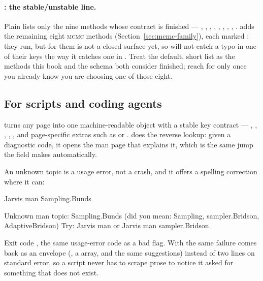 \paragraph{: the stable/unstable line.} Plain 
lists only the nine methods whose  contract is finished ---
, , , ,
, , , ,
.  adds the remaining eight \textsc{mcmc} methods
(Section~\ref{sec:mcmc-family}), each marked : they run, but
 for them is not a closed surface yet, so  will
not catch a typo in one of their keys the way it catches one in
. Treat the default, short list as the methods this book and
the schema both consider finished; reach for  only once you already know
you are choosing one of those eight.

\subsection{For scripts and coding agents}

 turns any page into one machine-readable object with a stable key
contract --- , , , ,
, and page-specific extras such as  or
.  does the reverse lookup: given a
diagnostic code, it opens the man page that explains it, which is the same jump the
 field makes automatically.

An unknown topic is a usage error, not a crash, and it offers a spelling correction
where it can:

\begin{terminal}
\begin{jcmd}
Jarvis man Sampling.Bunds
\end{jcmd}
\termsep
\begin{jout}
Unknown man topic: Sampling.Bunds (did you mean: Sampling, sampler.Bridson,
AdaptiveBridson)
Try: Jarvis man   or   Jarvis man sampler.Bridson
\end{jout}
\end{terminal}

Exit code , the same usage-error code as a bad flag. With  the same
failure comes back as an envelope (, a  array, and the
same  suggestions) instead of two lines on standard error, so a script
never has to scrape prose to notice it asked for something that does not exist.

